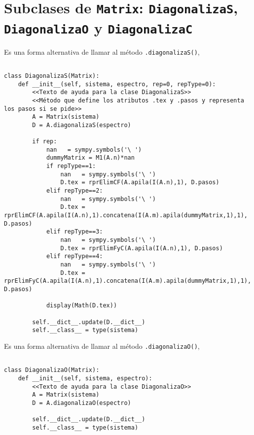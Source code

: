 \documentclass[11pt]{report}
\begin{document}
\section{Subclases de \texttt{Matrix}: \texttt{DiagonalizaS}, \texttt{DiagonalizaO} y  \texttt{DiagonalizaC}}
\label{sec:org3680a8c}
Es una forma alternativa de llamar al método \texttt{.diagonalizaS()},

\begin{verbatim}

class DiagonalizaS(Matrix):
    def __init__(self, sistema, espectro, rep=0, repType=0):
        <<Texto de ayuda para la clase DiagonalizaS>>
        <<Método que define los atributos .tex y .pasos y representa los pasos si se pide>>
        A = Matrix(sistema)
        D = A.diagonalizaS(espectro)
        
        if rep:
            nan   = sympy.symbols('\ ')
            dummyMatrix = M1(A.n)*nan
            if repType==1:
                nan   = sympy.symbols('\ ')
                D.tex = rprElimCF(A.apila(I(A.n),1), D.pasos)
            elif repType==2:
                nan   = sympy.symbols('\ ')
                D.tex = rprElimCF(A.apila(I(A.n),1).concatena(I(A.m).apila(dummyMatrix,1),1), D.pasos)
            elif repType==3:
                nan   = sympy.symbols('\ ')
                D.tex = rprElimFyC(A.apila(I(A.n),1), D.pasos)
            elif repType==4:
                nan   = sympy.symbols('\ ')
                D.tex = rprElimFyC(A.apila(I(A.n),1).concatena(I(A.m).apila(dummyMatrix,1),1), D.pasos)
                
            display(Math(D.tex))
            
        self.__dict__.update(D.__dict__)
        self.__class__ = type(sistema)

\end{verbatim}

Es una forma alternativa de llamar al método \texttt{.diagonalizaO()},

\begin{verbatim}

class DiagonalizaO(Matrix):
    def __init__(self, sistema, espectro):
        <<Texto de ayuda para la clase DiagonalizaO>>
        A = Matrix(sistema)
        D = A.diagonalizaO(espectro)
            
        self.__dict__.update(D.__dict__)
        self.__class__ = type(sistema)

\end{verbatim}
\end{document}
